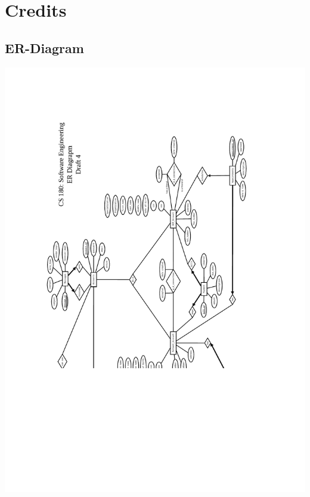 \documentclass[12pt]{report}
\begin{document}
\part{Credits}


\appendix
\chapter{ER-Diagram}
\includegraphics[scale=0.6]{cs180_ER_draft4.pdf}
\end{document}
